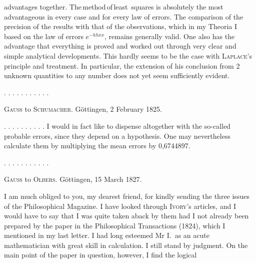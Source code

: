 advantages together. The\,method\,of\,least\ squares is absolutely the most advantageous in every case and for every law of errors. The comparison of the precision of the results with that of the observations, which in my Theoria I based on the law of errors $e^{-hhxx}$, remains generally valid. One also has the advantage that everything is proved and worked out through very clear and simple analytical developments. This hardly seems to be the case with \textsc{Laplace}'s principle and treatment. In particular, the extension of his conclusion from 2 unknown quantities to any number does not yet seem sufficiently evident.

\noindent . . . . . . . . . . .



\begin{center}
\textsc{Gauss} to \textsc{Schumacher}. Göttingen, 2 February 1825.
\end{center}

\noindent . . . . . . . . . . I would in fact like to dispense altogether with the so-called probable errors, since they depend on a hypothesis. One may nevertheless calculate them by multiplying the mean errors by 0,6744897.

\noindent . . . . . . . . . . .



\begin{center}
\textsc{Gauss} to \textsc{Olbers}. Göttingen, 15 March 1827.
\end{center}

\noindent I am much obliged to you, my dearest friend, for kindly sending the three issues of the Philosophical Magazine. I have looked through \textsc{Ivory}'s articles, and I would have to say that I was quite taken aback by them had I not already been prepared by the paper in the Philosophical Transactions (1824), which I mentioned in my last letter. I had long esteemed Mr I.\ as an acute mathematician with great skill in calculation. I still stand by  judgment. On the main point of the paper in question, however, I find the logical\space%
